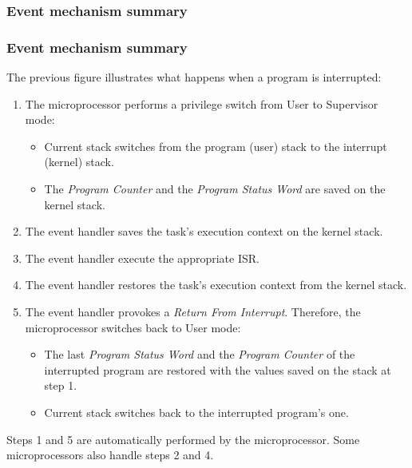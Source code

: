 %
%
%

\begin{frame}
  \frametitle{Event mechanism summary}


\end{frame}

%
%
%

\begin{frame}
  \frametitle{Event mechanism summary}

  The previous figure illustrates what happens when a program is interrupted:

  \nl

  \begin{enumerate}
    \item The microprocessor performs a privilege switch from User to Supervisor
      mode:
      \begin{itemize}
        \item Current stack switches from the program (user) stack to the
	  interrupt (kernel) stack.
        \item The {\em Program Counter} and the {\em Program Status Word} are
	 saved on the kernel stack.
      \end{itemize}
    \item The event handler saves the task's execution context on the kernel
      stack.
    \item The event handler execute the appropriate ISR.
    \item The event handler restores the task's execution context from the
      kernel stack.
    \item The event handler provokes a {\em Return From Interrupt}. Therefore,
      the microprocessor switches back to User mode:
    \begin{itemize}
      \item The last {\em Program Status Word} and the {\em Program Counter}
        of the interrupted program are restored with the values saved on the
	stack at step 1.
      \item Current stack switches back to the interrupted program's one.
    \end{itemize}
  \end{enumerate}

  \nl

  Steps 1 and 5 are automatically performed by the microprocessor. Some
  microprocessors also handle steps 2 and 4.

\end{frame}

